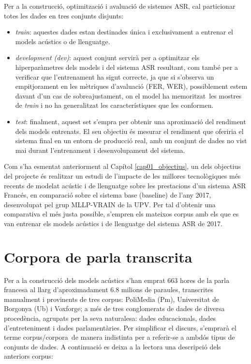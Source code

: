 Per a la construcció, optimització i avaluació de sistemes ASR, cal particionar totes les dades en tres conjunts disjunts:
\begin{itemize}
    \item \emph{train}: aquestes dades estan destinades única i exclusivament a entrenar el models acústics o de llenguatge.
    \item \emph{development (dev)}: aquest conjunt servirà per a optimitzar els hiperparàmetres dels models i del sistema ASR resultant, com també per a verificar que l'entrenament ha sigut correcte, ja que si s'observa un empitjorament en les mètriques d'avaluació (FER, WER), possiblement estem davant d'un cas de sobreajustament, on el model ha \guillemotleft memoritzat\guillemotright ~les mostres de \textit{train} i no ha generalitzat les característiques que les conformen.
    \item \emph{test}: finalment, aquest set s'empra per obtenir una aproximació del rendiment dels models entrenats. El seu objectiu és mesurar el rendiment que oferiria el sistema final en un entorn de producció real, amb un conjunt de dades no vist mai durant l'entrenament i desenvolupament del sistema.
\end{itemize}

Com s'ha esmentat anteriorment al Capítol \ref{cap01_objectius}, un dels objectius del projecte és realitzar un estudi de l'impacte de les millores tecnològiques més recents de modelat acústic i de llenguatge sobre les prestacions d'un sistema ASR Francés, en comparació sobre el sistema base (baseline) de l'any 2017, desenvolupat pel grup MLLP-VRAIN de la UPV. Per tal d'obtenir una comparativa el més justa possible, s'empren els mateixos corpus amb els que es van entrenar els models acústics i de llenguatge del sistema ASR de 2017. 

\section{Corpora de parla transcrita}
\label{cap04_corpus}
Per a la construcció dels models acústics s'han emprat 663 hores de la parla francesa al llarg d'aproximadament 6.8 milions de paraules, transcrites manualment i provinents de tres corpus: PoliMedia (Pm), Universitat de Borgonya (Ub) i Voxforge; a més de tres conglomerats de dades de diversa procedència, agrupats per la seva naturalesa: dades educacionals, dades d'entreteniment i dades parlamentàries. Per simplificar el discurs, s'emprarà el terme \guillemotleft corpus/corpora\guillemotright ~de manera indistinta per a referir-se a ambdós tipus de conjunts de dades.
A continuació es deixa a la lectora una descripció dels anteriors corpus:

